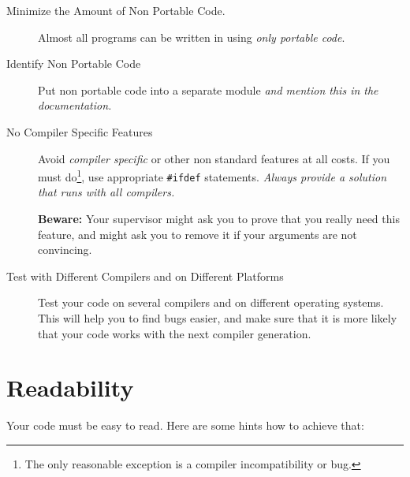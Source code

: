 \begin{description}
  
  \item[Minimize the Amount of Non Portable Code.]
  Almost all programs can be written in using \emph{only portable
    code}.
  
  \item[Identify Non Portable Code] Put non portable code into a
  separate module \emph{and mention this in the documentation.}
  
  \item[No Compiler Specific Features] Avoid \emph{compiler
    specific} or other non standard features at all costs.  If
  you must do\footnote{The only reasonable exception is a
    compiler incompatibility or bug.}, use appropriate
  \texttt{\#ifdef} statements.  \emph{Always provide a solution
    that runs with all compilers.}
  
  \textbf{Beware:} Your supervisor might ask you to prove that
  you really need this feature, and might ask you to remove it if
  your arguments are not convincing.
  
  \item[Test with Different Compilers and on Different Platforms]
  Test your code on several compilers and on different operating
  systems.  This will help you to find bugs easier, and make sure
  that it is more likely that your code works with the next
  compiler generation.

\end{description}


%
%
%

\section{Readability}

Your code must be easy to read.  Here are some hints how to
achieve that:

